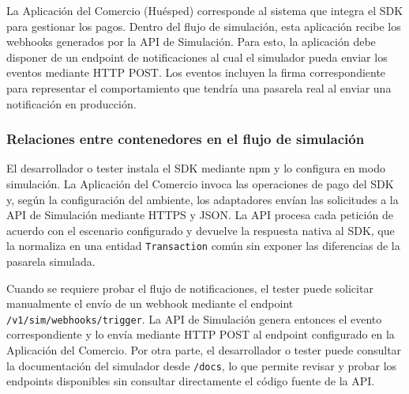 La Aplicación del Comercio (Huésped) corresponde al sistema que integra el SDK para gestionar los pagos. Dentro del flujo de simulación, esta aplicación recibe los webhooks generados por la API de Simulación. Para esto, la aplicación debe disponer de un endpoint de notificaciones al cual el simulador pueda enviar los eventos mediante HTTP POST. Los eventos incluyen la firma correspondiente para representar el comportamiento que tendría una pasarela real al enviar una notificación en producción.

\subsubsection{Relaciones entre contenedores en el flujo de simulación}
El desarrollador o tester instala el SDK mediante npm y lo configura en modo simulación. La Aplicación del Comercio invoca las operaciones de pago del SDK y, según la configuración del ambiente, los adaptadores envían las solicitudes a la API de Simulación mediante HTTPS y JSON. La API procesa cada petición de acuerdo con el escenario configurado y devuelve la respuesta nativa al SDK, que la normaliza en una entidad \texttt{Transaction} común sin exponer las diferencias de la pasarela simulada.

Cuando se requiere probar el flujo de notificaciones, el tester puede solicitar manualmente el envío de un webhook mediante el endpoint \texttt{/v1/sim/webhooks/trigger}. La API de Simulación genera entonces el evento correspondiente y lo envía mediante HTTP POST al endpoint configurado en la Aplicación del Comercio. Por otra parte, el desarrollador o tester puede consultar la documentación del simulador desde \texttt{/docs}, lo que permite revisar y probar los endpoints disponibles sin consultar directamente el código fuente de la API.

